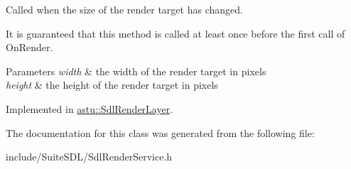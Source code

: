 Called when the size of the render target has changed.

It is guaranteed that this method is called at least once before the first call of {\ttfamily On\+Render}.


\begin{DoxyParams}{Parameters}
{\em width} & the width of the render target in pixels \\
\hline
{\em height} & the height of the render target in pixels \\
\hline
\end{DoxyParams}


Implemented in \hyperlink{classastu_1_1SdlRenderLayer_af9b0cfe1797705f509bc18db0c8a5320}{astu\+::\+Sdl\+Render\+Layer}.



The documentation for this class was generated from the following file\+:\begin{DoxyCompactItemize}
\item 
include/\+Suite\+S\+D\+L/Sdl\+Render\+Service.\+h\end{DoxyCompactItemize}
